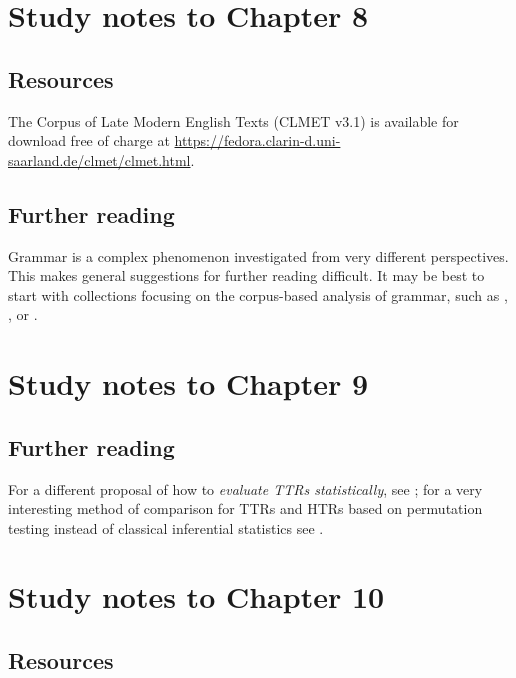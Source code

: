 \section*{Study notes to Chapter 8}
\label{sec:studynotes08}

\subsection*{Resources}

The Corpus of Late Modern English Texts (CLMET v3.1) is available for download free of charge at \url{https://fedora.clarin-d.uni-saarland.de/clmet/clmet.html}.

\subsection*{Further reading}

Grammar is a complex phenomenon investigated from very different perspectives. This makes general suggestions for further reading difficult. It may be best to start with collections focusing on the corpus-based analysis of grammar, such as \citet{rohdenburg_determinants_2003}, \citet{gries_corpora_2006}, \citet{rohdenburg_one_2009} or \citet{lindquist_corpus_2004}.

\section*{Study notes to Chapter 9}
\label{sec:studynotes09}

\subsection*{Further reading}

For a different proposal of how to \textit{evaluate TTRs statistically}, see \citet[Section 6.5]{baayen_analyzing_2008}; for a very interesting method of comparison for TTRs and HTRs based on permutation testing instead of classical inferential statistics see \citet{saily_comparing_2009}.

\section*{Study notes to Chapter 10}
\label{sec:studynotes10}

\subsection*{Resources}

